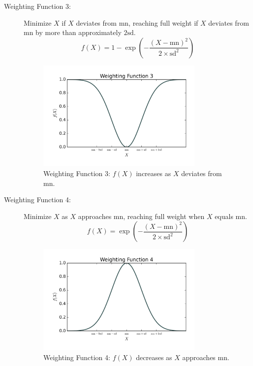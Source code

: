 \documentclass[a4paper,12pt]{article}
\begin{document}
\begin{description}
    \item[Weighting Function 3:] Minimize \(X\) if \(X\) deviates from \(\text{mn}\),
          reaching full weight if \(X\) deviates from \(\text{mn}\) by more than
          approximately \(2\text{sd}\).
          \begin{equation}
              f(X) = 1 - \exp\left(-\frac{(X - \text{mn})^2}{2 \times \text{sd}^2}\right)
          \end{equation}
          \begin{figure}[H]
              \centering
              \includegraphics[width=0.8\textwidth]{figures/weighting_function_3.png}
              \caption{Weighting Function 3: \(f(X)\) increases as \(X\) deviates from \(\text{mn}\).}
          \end{figure}

    \item[Weighting Function 4:] Minimize \(X\) as \(X\) approaches \(\text{mn}\),
          reaching full weight when \(X\) equals \(\text{mn}\).
          \begin{equation}
              f(X) = \exp\left(-\frac{(X - \text{mn})^2}{2 \times \text{sd}^2}\right)
          \end{equation}
          \begin{figure}[H]
              \centering
              \includegraphics[width=0.8\textwidth]{figures/weighting_function_4.png}
              \caption{Weighting Function 4: \(f(X)\) decreases as \(X\) approaches \(\text{mn}\).}
          \end{figure}
\end{description}
\end{document}
